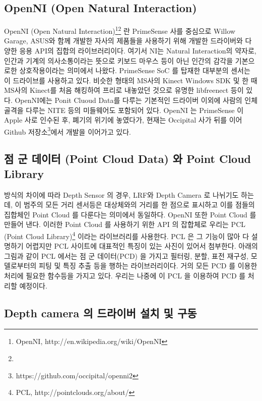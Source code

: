 \subsection{OpenNI (Open Natural Interaction)}

OpenNI (Open Natural Interaction)\footnote{OpenNI, http://en.wikipedia.org/wiki/OpenNI}\footnote{} 란 PrimeSense 사를 중심으로 Willow Garage, ASUS와 함께 개발한 자사의 제품들을 사용하기 위해 개발한 드라이버와 다양한 응용 API의 집합의 라이브러리이다. 여기서 NI는 Natural Interaction의 약자로, 인간과 기계의 의사소통이라는 뜻으로 키보드 마우스 등이 아닌 인간의 감각을 기본으로한 상호작용이라는 의미에서 나왔다. PrimeSense SoC 를 탑재한 대부분의 센서는 이 드라이브를 사용하고 있다. 비슷한 형태의 MS사의 Kinect Windows SDK 및 한 때 MS사의 Kinect를 처음 해킹하여 프리로 내놓았던 것으로 유명한 libfreenect 등이 있다. OpenNI에는 Ponit Cluoud Data를 다루는 기본적인 드라이버 이외에 사람의 인체 골격을 다루는 NITE 등의 미들웨어도 포함되어 있다. OpenNI 는 PrimeSense 이 Apple 사로 인수된 후, 폐기의 위기에 놓였다가, 현재는 Occipital 사가 뒤를 이어 Github 저장소\footnote{https://github.com/occipital/openni2}에서 개발을 이어가고 있다.

\subsection{점 군 데이터 (Point Cloud Data) 와 Point Cloud Library}

방식의 차이에 따라 Depth Sensor 의 경우, LRF와 Depth Camera 로 나뉘기도 하는데, 이 범주의 모든 거리 센서등은 대상체와의 거리를 한 점으로 표시하고 이를 점들의 집합체인 Point Cloud 를 다룬다는 의미에서 동일하다. OpenNI 또한 Point Cloud 를 만들어 낸다. 이러한 Point Cloud 를 사용하기 위한 API 의 잡합체로 우리는 PCL (Point Cloud Library)\footnote{PCL, http://pointclouds.org/about/} 이라는 라이브러리를 사용한다. PCL 은 그 기능이 많아 다 설명하기 어렵지만 PCL 사이트에 대표적인 특징이 있는 사진이 있어서 첨부한다. 아래의 그림과 같이 PCL 에서는 점 군 데이터(PCD) 을 가지고 필터링, 분할, 표전 재구성, 모델로부터의 피팅 및 특징 추출 등을 행하는 라이브러리이다. 거의 모든 PCD 를 이용한 처리에 필요한 함수등을 가지고 있다. 우리는 나중에 이 PCL 을 이용하여 PCD 를 처리할 예정이다.

\subsection{Depth camera 의 드라이버 설치 및 구동}

